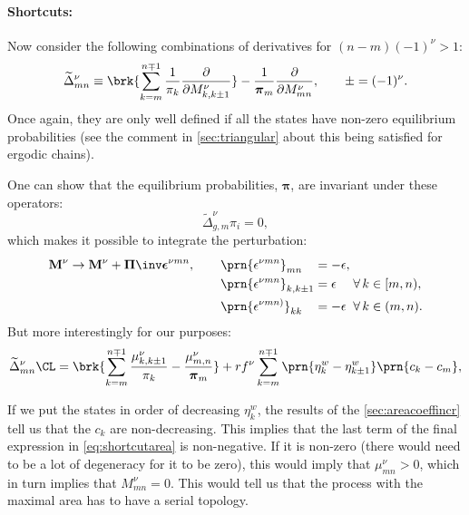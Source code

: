\documentclass[12pt]{article}
\newcommand{\eqm}{\pi}
\newcommand{\eq}{\boldsymbol{\eqm}}
\newcommand{\Eqm}{\Pi}
\newcommand{\Eq}{\boldsymbol{\Eqm}}
\newcommand{\etwm}{\eta^w}
\newcommand{\MMdm}{M}
\newcommand{\MMd}{\mathbf{\MMdm}}
\renewcommand{\pdiff}[2]{\frac{\partial #1}{\partial #2}}
\begin{document}
\paragraph{Shortcuts:}\label{sec:shortcuts}

Now consider the following combinations of derivatives for $(n - m)(-1)^\nu > 1$:
%
\begin{equation}\label{eq:shortcutderiv}
  \widetilde{\Delta}^\nu_{mn} \equiv
    \brk{ \sum_{k=m}^{n \mp 1} \frac{1}{\eqm_{k}} \pdiff{}{\MMdm^\nu_{k,k \pm 1}} }
    - \frac{1}{\eq_m} \pdiff{}{\MMdm^\nu_{mn}},
  \qquad \pm = (-1)^\nu.
\end{equation}
%
Once again, they are only well defined if all the states have non-zero equilibrium probabilities (see the comment in \cref{sec:triangular} about this being satisfied for ergodic chains).

One can show that the equilibrium probabilities, $\eq$, are invariant under these operators:
%
\begin{equation}\label{eq:shortcutprob}
  \widetilde{\Delta}^\nu_{g,m} \eqm_i = 0,
\end{equation}
%
which makes it possible to integrate the perturbation:
%
\begin{equation}\label{eq:shortcutfinite}
  \MMd^\nu \to \MMd^\nu + \Eq\inv \boldsymbol{\epsilon}^{\nu mn},
  \qquad
  \begin{alignedat}[t]{3}
    &\prn{{\epsilon}^{\nu mn}}_{mn}
      &&= -\epsilon,\\
    &\prn{{\epsilon}^{\nu mn}}_{k,k\pm1}
      &&= \epsilon
      &\;&\forall\, k \in [m,n),\\
    &\prn{{\epsilon}^{\nu mn)}}_{kk}
      &&= -\epsilon
      &&\forall\, k \in (m,n).
  \end{alignedat}
\end{equation}
%
But more interestingly for our purposes:
%
\begin{equation}\label{eq:shortcutarea}
    \widetilde{\Delta}^\nu_{mn}\CL =
      \brk{ \sum_{k=m}^{n\mp1} \frac{\mu^\nu_{k,k\pm1}}{\eqm_k}
      - \frac{\mu^\nu_{m,n}}{\eq_m}}
      + rf^\nu \sum_{k=m}^{n\mp1} \prn{\etwm_{k} - \etwm_{k\pm1}} \prn{c_k - c_m},
\end{equation}
%

If we put the states in order of decreasing $\etwm_k$, the results of the \cref{sec:areacoeffincr} tell us that the $c_k$ are non-decreasing.
This implies that the last term of the final expression in \eqref{eq:shortcutarea} is non-negative.
If it is non-zero (there would need to be a lot of degeneracy for it to be zero), this would imply that $\mu^\nu_{mn} > 0$, which in turn implies that $\MMdm^\nu_{mn}=0$.
This would tell us that the process with the maximal area has to have a serial topology.
\end{document}
